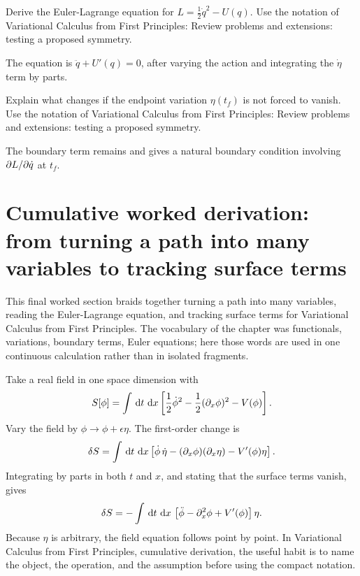 \begin{exercise}
Derive the Euler-Lagrange equation for \(L=\frac12\dot q^2-U(q)\).  Use the notation of Variational Calculus from First Principles: Review problems and extensions: testing a proposed symmetry.
\begin{answer}
The equation is \(\ddot q+U'(q)=0\), after varying the action and integrating the \(\dot\eta\) term by parts.
\end{answer}
\end{exercise}

\begin{exercise}
Explain what changes if the endpoint variation \(\eta(t_f)\) is not forced to vanish.  Use the notation of Variational Calculus from First Principles: Review problems and extensions: testing a proposed symmetry.
\begin{answer}
The boundary term remains and gives a natural boundary condition involving \(\partial L/\partial\dot q\) at \(t_f\).
\end{answer}
\end{exercise}



\section{Cumulative worked derivation: from turning a path into many variables to tracking surface terms}

This final worked section braids together turning a path into many variables, reading the Euler-Lagrange equation, and tracking surface terms for Variational Calculus from First Principles.  The vocabulary of the chapter was functionals, variations, boundary terms, Euler equations; here those words are used in one continuous calculation rather than in isolated fragments.

Take a real field in one space dimension with
\[
  S[\phi]=\int\,\mathrm d t\,\,\mathrm d x\left[
  \frac12\dot\phi^2-\frac12(\partial_x\phi)^2-V(\phi)
  \right].
\]
Vary the field by \(\phi\to\phi+\epsilon\eta\).  The first-order change is
\[
  \delta S=\int\,\mathrm d t\,\,\mathrm d x\left[
  \dot\phi\,\dot\eta-(\partial_x\phi)(\partial_x\eta)-V'(\phi)\eta
  \right].
\]
Integrating by parts in both \(t\) and \(x\), and stating that the surface terms vanish, gives
\[
  \delta S=-\int\,\mathrm d t\,\,\mathrm d x\,
  \left[\ddot\phi-\partial_x^2\phi+V'(\phi)\right]\eta.
\]
Because \(\eta\) is arbitrary, the field equation follows point by point.  In Variational Calculus from First Principles, cumulative derivation, the useful habit is to name the object, the operation, and the assumption before using the compact notation.


